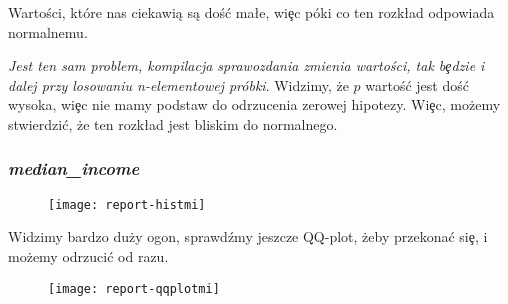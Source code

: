 \documentclass{article}
\begin{document}
\noindent
\quad Wartości, które nas ciekawią są doś\'c ma\l e, wi\c ec póki co ten rozk\l ad odpowiada normalnemu.

\begin{Schunk}
\end{Schunk}

\noindent
\quad \textit{Jest ten sam problem, kompilacja sprawozdania zmienia wartości, tak b\c edzie i dalej przy losowaniu n-elementowej próbki}. Widzimy, że $p$ wartoś\'c jest doś\'c wysoka, wi\c ec nie mamy podstaw do odrzucenia zerowej hipotezy. Wi\c ec, możemy stwierdzi\'c, że ten rozk\l ad jest bliskim do normalnego.

\subsubsection{\textit{median\_income}}
\begin{figure}[h!]
\centering
\texttt{[image: report-histmi]}
\end{figure}

\noindent
\quad Widzimy bardzo duży ogon, sprawdźmy jeszcze QQ-plot, żeby przekona\'c si\c e, i możemy odrzuci\'c od razu.

\begin{figure}[h!]
\centering
\texttt{[image: report-qqplotmi]}
\end{figure}
\end{document}
